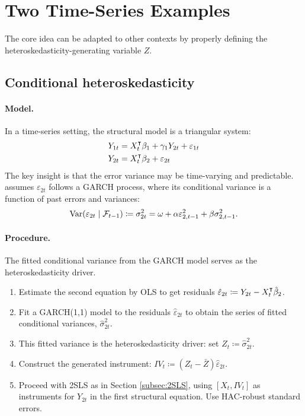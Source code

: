 \section{Two Time-Series Examples}

The core idea can be adapted to other contexts by properly defining
the heteroskedasticity-generating variable $Z$.

\subsection{Conditional heteroskedasticity \textcite{prono2014}}

\paragraph{Model.}

In a time-series setting, the structural model is a triangular system:
\begin{align*}
Y_{1t} & =X_{t}^{\intercal}\beta_{1}+\gamma_{1}Y_{2t}+\varepsilon_{1t}\\
Y_{2t} & =X_{t}^{\intercal}\beta_{2}+\varepsilon_{2t}
\end{align*}
The key insight is that the error variance may be time-varying and
predictable. \textcite{prono2014} assumes $\varepsilon_{2t}$ follows
a GARCH process, where its conditional variance is a function of past
errors and variances:
\[
\operatorname{Var}(\varepsilon_{2t}\mid\mathcal{F}_{t-1})\coloneqq\sigma_{2t}^{2}=\omega+\alpha\varepsilon_{2,t-1}^{2}+\beta\sigma_{2,t-1}^{2}.
\]


\paragraph{Procedure.}

The fitted conditional variance from the GARCH model serves as the
heteroskedasticity driver.
\begin{enumerate}
\itemsep2pt
\item Estimate the second equation by OLS to get residuals $\hat{\varepsilon}_{2t}\coloneqq Y_{2t}-X_{t}^{\intercal}\hat{\beta}_{2}$.
\item Fit a GARCH(1,1) model to the residuals $\hat{\varepsilon}_{2t}$
to obtain the series of fitted conditional variances, $\hat{\sigma}_{2t}^{2}$.
\item This fitted variance is the heteroskedasticity driver: set $Z_{t}\coloneqq\hat{\sigma}_{2t}^{2}$.
\item Construct the generated instrument: $IV_{t}\coloneqq(Z_{t}-\bar{Z})\hat{\varepsilon}_{2t}$.
\item Proceed with 2SLS as in Section \ref{subsec:2SLS}, using $[X_{t},IV_{t}]$
as instruments for $Y_{2t}$ in the first structural equation. Use
HAC-robust standard errors.
\end{enumerate}


